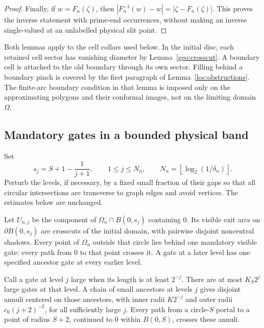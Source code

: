 \begin{proof}
Finally, if \(w=F_n(\zeta)\), then
\(|F_n^{-1}(w)-w|=|\zeta-F_n(\zeta)|\).
This proves the inverse statement with prime-end
occurrences, without making an inverse single-valued at
an unlabelled physical slit point.
\end{proof}

\begin{remark}
\label{loc:collars}
Both lemmas apply to the cell collars used below.
In the initial disc, each retained cell sector has vanishing
diameter by Lemma~\ref{geo:crosscut}. A boundary cell is
attached to the old boundary through its own sector.
Filling behind a boundary pinch is covered by the first
paragraph of Lemma~\ref{loc:obstructions}.
The finite-arc boundary condition in that lemma is imposed
only on the approximating polygons and their conformal
images, not on the limiting domain \(\Omega\).
\end{remark}

\subsection{Mandatory gates in a bounded physical band}

Set
\begin{equation}
 s_j=S+1-\frac1{j+1},\qquad
 1\le j\le N_n,\qquad
 N_n=\left\lfloor\log_2(1/\delta_n)\right\rfloor .
 \label{loc:levels}
\end{equation}
Perturb the levels, if necessary, by a fixed small fraction
of their gaps so that all circular intersections are
transverse to graph edges and avoid vertices. The estimates
below are unchanged.

\begin{lemma}
\label{loc:gates}
Let \(U_{n,j}\) be the component of
\(\Omega_n\cap B(0,s_j)\) containing \(0\).
Its visible exit arcs on \(\partial B(0,s_j)\) are crosscuts
of the initial domain, with pairwise disjoint noncentral
shadows. Every point of \(\Omega_n\) outside that circle
lies behind one mandatory visible gate: every path from
\(0\) to that point crosses it. A gate at a later level has
one specified ancestor gate at every earlier level.

Call a gate at level \(j\) large when its length is at least
\(2^{-j}\). There are at most \(K_S2^j\) large gates at that
level. A chain of small ancestors at levels \(j\) gives
disjoint annuli centered on those ancestors, with inner
radii \(K2^{-j}\) and outer radii \(c_0(j+2)^{-2}\),
for all sufficiently large \(j\). Every path from a
circle-\(S\) portal to a point of radius \(S+2\), continued
to \(0\) within \(B(0,S)\), crosses these annuli.
\end{lemma}

